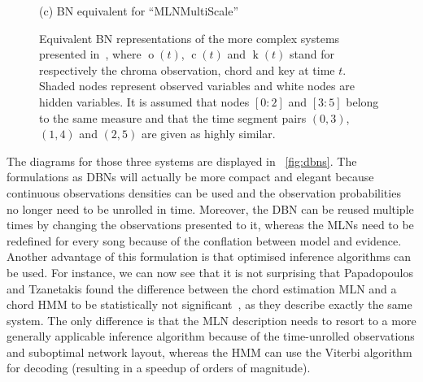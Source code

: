 \documentclass[letterpaper]{article} %
\newcommand{\figref}[1]{\figurename~\ref{fig:#1}} %
\begin{document}
\begin{figure}[htb!]
\begin{minipage}[b]{\linewidth}
\begin{tikzpicture}[align=center]
  \end{tikzpicture}
  \centerline{(c) BN equivalent for ``MLNMultiScale''}\medskip
\end{minipage}

\caption{Equivalent BN representations of the more complex systems presented in~\cite{papadopoulos2017taslp}, where $\operatorname{o}\left(t\right)$, $\operatorname{c}\left(t\right)$ and $\operatorname{k}\left(t\right)$ stand for respectively the chroma observation, chord and key at time $t$. Shaded nodes represent observed variables and white nodes are hidden variables. It is assumed that nodes $[0:2]$ and $[3:5]$ belong to the same measure and that the time segment pairs $\left(0,3\right)$,$\left(1,4\right)$ and $\left(2,5\right)$ are given as highly similar.}
\label{fig:bn}
\end{figure}

The diagrams for those three systems are displayed in \figref{dbns}. The formulations as DBNs will actually be more compact and elegant because continuous observations densities can be used and the observation probabilities no longer need to be unrolled in time. Moreover, the DBN can be reused multiple times by changing the observations presented to it, whereas the MLNs need to be redefined for every song because of the conflation between model and evidence. Another advantage of this formulation is that optimised inference algorithms can be used. For instance, we can now see that it is not surprising that Papadopoulos and Tzanetakis found the difference between the chord estimation MLN and a chord HMM to be statistically not significant~\cite{papadopoulos2012ismir}, as they describe exactly the same system. The only difference is that the MLN description needs to resort to a more generally applicable inference algorithm because of the time-unrolled observations and suboptimal network layout, whereas the HMM can use the Viterbi algorithm for decoding (resulting in a speedup of orders of magnitude).

\end{document}
